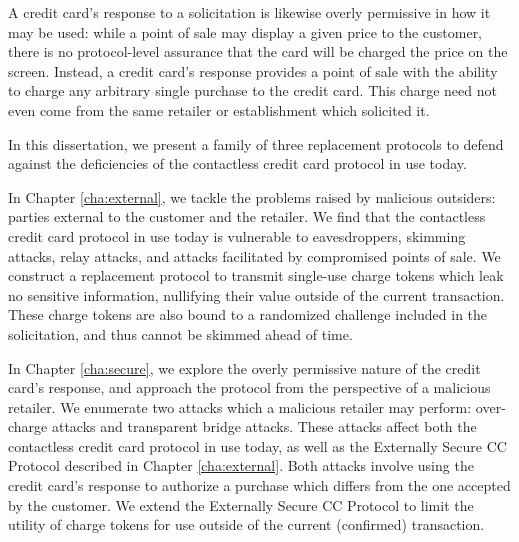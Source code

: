 A credit card's response to a solicitation is likewise overly permissive in how it may be used:
    while a point of sale may display a given price to the customer, there is no protocol-level assurance that the card will be charged the price on the screen.
Instead, a credit card's response provides a point of sale with the ability to charge any arbitrary single purchase to the credit card.
This charge need not even come from the same retailer or establishment which solicited it.

In this dissertation, we present a family of three replacement protocols to defend against the deficiencies of the contactless credit card protocol in use today.

In Chapter \ref{cha:external}, we tackle the problems raised by malicious outsiders: parties external to the customer and the retailer.
We find that the contactless credit card protocol in use today is vulnerable to eavesdroppers, skimming attacks, relay attacks, and attacks facilitated by compromised points of sale.
We construct a replacement protocol to transmit single-use charge tokens which leak no sensitive information, nullifying their value outside of the current transaction.
These charge tokens are also bound to a randomized challenge included in the solicitation, and thus cannot be skimmed ahead of time.

In Chapter \ref{cha:secure}, we explore the overly permissive nature of the credit card's response, and approach the protocol from the perspective of a malicious retailer.
We enumerate two attacks which a malicious retailer may perform: over-charge attacks and transparent bridge attacks.
These attacks affect both the contactless credit card protocol in use today, as well as the Externally Secure CC Protocol described in Chapter \ref{cha:external}.
Both attacks involve using the credit card's response to authorize a purchase which differs from the one accepted by the customer.
We extend the Externally Secure CC Protocol to limit the utility of charge tokens for use outside of the current (confirmed) transaction.